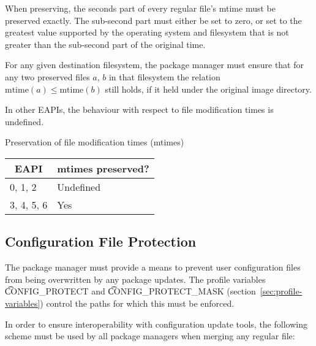 When preserving, the seconds part of every regular file's mtime must
be preserved exactly. The sub-second part must either be set to zero,
or set to the greatest value supported by the operating system and
filesystem that is not greater than the sub-second part of the
original time.

For any given destination filesystem, the package manager must ensure
that for any two preserved files $a$, $b$ in that filesystem the
relation $\mbox{mtime}(a) \leq \mbox{mtime}(b)$ still holds, if it
held under the original image directory.

In other EAPIs, the behaviour with respect to file modification times
is undefined.

\begin{centertable}{Preservation of file modification times (mtimes)}
    \label{tab:mtime-preserve}
    \begin{tabular}{ll}
      \toprule
      \multicolumn{1}{c}{\textbf{EAPI}} &
      \multicolumn{1}{c}{\textbf{mtimes preserved?}} \\
      \midrule
      0, 1, 2           & Undefined \\
      3, 4, 5, 6        & Yes       \\
      \bottomrule
    \end{tabular}
\end{centertable}

\subsection{Configuration File Protection}
\label{sec:config-protect}

The package manager must provide a means to prevent user configuration files from being
overwritten by any package updates. The profile variables \t{CONFIG\_PROTECT} and
\t{CONFIG\_PROTECT\_MASK} (section~\ref{sec:profile-variables}) control the paths for which this
must be enforced.

In order to ensure interoperability with configuration update tools, the following scheme must be
used by all package managers when merging any regular file:

